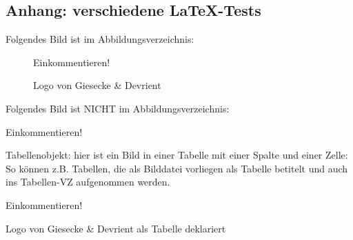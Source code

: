 \documentclass[12pt,oneside,a4paper,bibtotoc,liststotoc,pointlessnumbers]{scrartcl}
\begin{document}
\begin{appendix}
\newpage



\newpage
\section{Anhang: verschiedene LaTeX-Tests}

\nocite{*}

\newpage
Folgendes Bild ist im Abbildungsverzeichnis:
\begin{figure}[h]							
\centering 
Einkommentieren!
\caption{Logo von Giesecke \& Devrient}									%
\label{fig:LogoGD}												%
\end{figure}

Folgendes Bild ist NICHT im Abbildungsverzeichnis: \\ %
\begin{center}
Einkommentieren!
\end{center}

Tabellenobjekt: hier ist ein Bild in einer Tabelle mit einer Spalte und einer Zelle:
So können z.B. Tabellen, die als Bilddatei vorliegen als Tabelle betitelt und auch ins Tabellen-VZ aufgenommen werden.
\begin{table}[h]							
\centering 
Einkommentieren!
\caption{Logo von Giesecke \& Devrient als Tabelle deklariert}									%
\label{fig:LogoGD}												%
\end{table}




\end{appendix}

\end{document}
